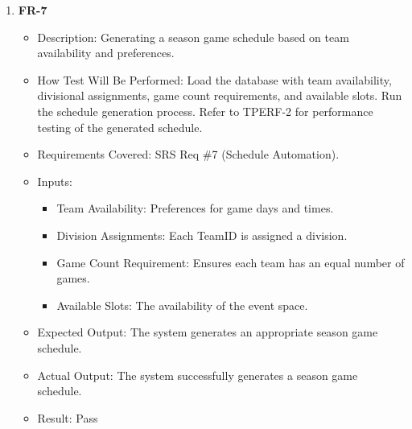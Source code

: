 \documentclass[12pt, titlepage]{article}
\begin{document}
\begin{enumerate}

      \item \textbf{FR-7}  
      \begin{itemize}
          \item Description: Generating a season game schedule based on team availability and preferences.
          \item How Test Will Be Performed: Load the database with team availability, divisional assignments, game count requirements, and available slots. Run the schedule generation process. Refer to TPERF-2 for performance testing of the generated schedule.
          \item Requirements Covered: SRS Req \#7 (Schedule Automation).
          \item Inputs:  
              \begin{itemize}
                  \item Team Availability: Preferences for game days and times.  
                  \item Division Assignments: Each TeamID is assigned a division.  
                  \item Game Count Requirement: Ensures each team has an equal number of games.  
                  \item Available Slots: The availability of the event space.  
              \end{itemize}
          \item Expected Output: The system generates an appropriate season game schedule.
          \item Actual Output: The system successfully generates a season game schedule.
          \item Result: Pass
      \end{itemize}


\end{enumerate}
\end{document}
